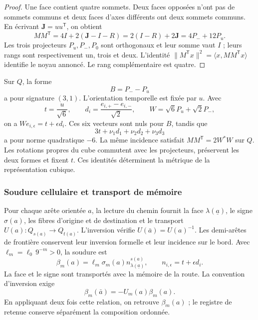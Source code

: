 \begin{proof}
Une face contient quatre sommets. Deux faces opposées n'ont pas de sommets
communs et deux faces d'axes différents ont deux sommets communs.
En écrivant \(\mathbf J=uu^{\mathsf T}\), on obtient
\[
 MM^{\mathsf T}=4I+2(\mathbf J-I-R)
 =2(I-R)+2\mathbf J=4P_-+12P_u.
\]
Les trois projecteurs \(P_u,P_-,P_0\) sont orthogonaux et leur somme vaut \(I\) ; leurs rangs sont respectivement un, trois et deux. L'identité \(\|M^{\mathsf T}x\|^2=\langle x,MM^{\mathsf T}x\rangle\) identifie le noyau annoncé. Le rang complémentaire est quatre.
\end{proof}

Sur \(Q\), la forme
\[
 B=P_--P_u
\]
a pour signature \((3,1)\). L'orientation temporelle est fixée par \(u\).
Avec
\[
 t=\frac{u}{\sqrt6},\qquad
 d_i=\frac{e_{i,+}-e_{i,-}}{\sqrt2},\qquad
 W=\sqrt6P_u+\sqrt2P_-,
\]
on a \(We_{i,\epsilon}=t+\epsilon d_i\). Ces six vecteurs
sont nuls pour \(B\), tandis que
\[
 3t+\nu_1d_1+\nu_2d_2+\nu_3d_3
\]
a pour norme quadratique \(-6\). La même incidence satisfait
\(MM^{\mathsf T}=2W^*W\) sur \(Q\). Les rotations propres du cube
commutent avec les projecteurs, préservent les deux formes et fixent \(t\).
Ces identités déterminent la métrique de la représentation cubique.

\subsubsection{Soudure cellulaire et transport de mémoire}
\label{vii:sec:soldadura-celular}

Pour chaque arête orientée \(a\), la lecture du chemin fournit
la face \(\lambda(\underline a)\), le signe
\(\sigma(a)\), les fibres d’origine et de destination et le transport
\(U(a):Q_{s(a)}\longrightarrow Q_{t(a)}\).
L’inversion vérifie \(U(\bar a)=U(a)^{-1}\).
Les demi-arêtes de frontière conservent leur inversion formelle et leur incidence
sur le bord. Avec \(\ell_m=\ell_0\,9^{-m}>0\), la soudure est
\begin{equation}
 \beta_m(a)=\ell_m\sigma_m(a)
              n_{\lambda(\underline a)}^{s(a)},\qquad
 n_{i,\epsilon}=t+\epsilon d_i.
 \label{vii:eq:soldadura-arista}
\end{equation}
La face et le signe sont transportés avec la mémoire de la route. La convention d'inversion exige
\begin{equation}
 \beta_m(\bar a)=-U_m(a)\beta_m(a).
 \label{vii:eq:inversion-soldadura}
\end{equation}
En appliquant deux fois cette relation, on retrouve \(\beta_m(a)\) ; le registre de retenue conserve séparément la composition ordonnée.

